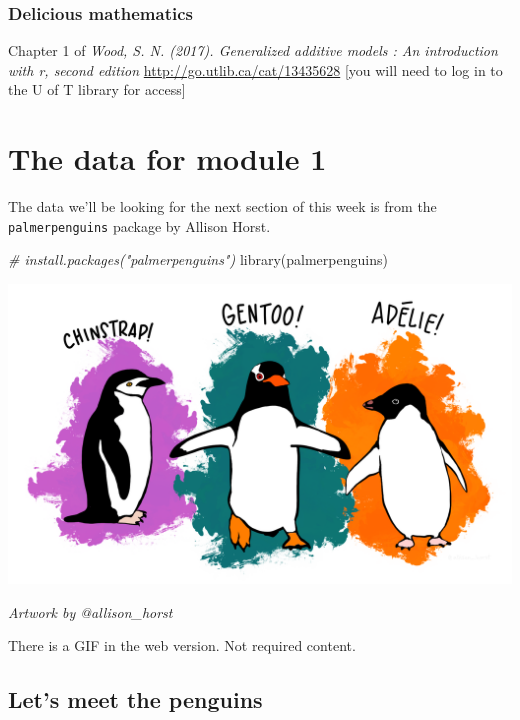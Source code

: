 \documentclass[
  openany]{book}
\newenvironment{Shaded}{\begin{snugshade}}{\end{snugshade}}
\newcommand{\CommentTok}[1]{\textcolor[rgb]{0.56,0.35,0.01}{\textit{#1}}}
\newcommand{\FunctionTok}[1]{\textcolor[rgb]{0.00,0.00,0.00}{#1}}
\newcommand{\NormalTok}[1]{#1}
\begin{document}
\hypertarget{delicious-mathematics}{%
\subsubsection{Delicious mathematics}\label{delicious-mathematics}}

Chapter 1 of \emph{Wood, S. N. (2017). Generalized additive models : An introduction with r, second edition}
\url{http://go.utlib.ca/cat/13435628} {[}you will need to log in to the U of T library for access{]}

\hypertarget{the-data-for-module-1}{%
\section{The data for module 1}\label{the-data-for-module-1}}

The data we'll be looking for the next section of this week is from the \texttt{palmerpenguins} package by Allison Horst.

\begin{Shaded}
\begin{Highlighting}[]
\CommentTok{\# install.packages("palmerpenguins")}
\FunctionTok{library}\NormalTok{(palmerpenguins)}
\end{Highlighting}
\end{Shaded}

\begin{center}\includegraphics[width=0.7\linewidth]{images/m1/lter_penguins} \end{center}

\emph{Artwork by @allison\_horst}

There is a GIF in the web version. Not required content.

\hypertarget{lets-meet-the-penguins}{%
\subsection{Let's meet the penguins}\label{lets-meet-the-penguins}}
\end{document}
